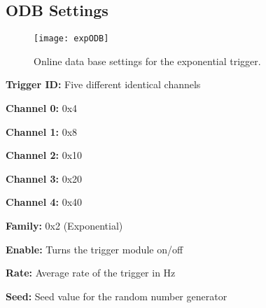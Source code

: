 \subsection{ODB Settings}
\label{sec:expODB}
\begin{figure}[ht]
\centering
\texttt{[image: expODB]}
\caption{Online data base settings for the exponential trigger.}
\label{Fig:expODB}
\end{figure}
 

\begin{description}
\item \textbf{Trigger ID: } Five different identical channels
	\begin{description}
	\item \textbf{Channel 0: }0x4
	\item \textbf{Channel 1: }0x8
	\item \textbf{Channel 2: }0x10
	\item \textbf{Channel 3: }0x20 
	\item \textbf{Channel 4: }0x40 
	\end{description}

\item \textbf{Family: } 0x2 (Exponential)

\item \textbf{Enable: }Turns the trigger module on/off

\item \textbf{Rate: }Average rate of the trigger in Hz

\item \textbf{Seed: }Seed value for the random number generator
\end{description}
 
